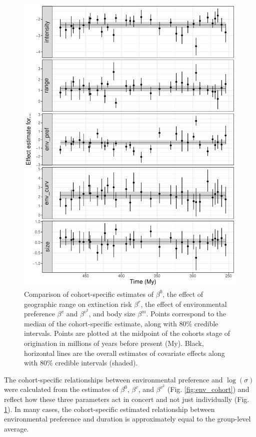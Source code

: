 \documentclass[11pt]{article}
\begin{document}
\begin{figure}[ht]
  \centering
  \includegraphics[width = \textwidth,height = 0.8\textheight,keepaspectratio=true]{figure/cohort_series_cweib_cens}
  \caption{Comparison of cohort-specific estimates of \(\beta^{0}\), the effect of geographic range on extinction risk \(\beta^{r}\), the effect of environmental preference \(\beta^{v}\) and \(\beta^{v^{2}}\), and body size \(\beta^{m}\). Points correspond to the median of the cohort-specific estimate, along with 80\% credible intervals. Points are plotted at the midpoint of the cohorts stage of origination in millions of years before present (My). Black, horizontal lines are the overall estimates of covariate effects along with 80\% credible intervals (shaded).}
  \label{fig:cohort_series}
\end{figure}



The cohort-specific relationships between environmental preference and \(\log(\sigma)\) were calculated from the estimates of \(\beta^{0}\), \(\beta^{v}\), and \(\beta^{v^{2}}\) (Fig. \ref{fig:env_cohort}) and reflect how these three parameters act in concert and not just individually (Fig. \ref{fig:cohort_series}). In many cases, the cohort-specific estimated relationship between environmental preference and duration is approximately equal to the group-level average.
\end{document}

